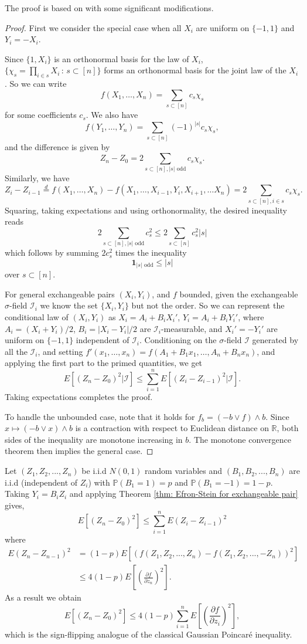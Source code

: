 \documentclass[letterpaper, 12pt]{article}
\theoremstyle{plain}
\theoremstyle{definition}
\theoremstyle{remark}
\begin{document}
The proof is based on \cite{steele1986efron} with some significant modifications.
\begin{proof}
First we consider the special case when all \(X_i\) are uniform on \(\{-1,1\}\) and \(Y_i=-X_i\).

Since \(\{1,X_i\}\) is an orthonormal basis for the law of \(X_i\), \(\{\chi_s=\prod_{i\in s}X_i\,:\,s\subset [n]\}\) forms an orthonormal basis for the joint law of the \(X_i\). So we can write
$$f(X_1,\ldots, X_n)=\sum_{s\subset [n]
}c_s\chi_s$$ for some coefficients \(c_s\). We also have
$$f(Y_1,\ldots, Y_n)=\sum_{s\subset[n]}(-1)^{|s|}c_s\chi_s,$$ and the difference is given by
$$
Z_n-Z_0=2\sum_{s\subset [n],|s| \text{ odd}} c_s\chi_s.
$$
Similarly, we have
$$
Z_{i}-Z_{i-1}\stackrel{d}{=}f(X_1,\ldots,X_n)-f(X_1,\ldots,X_{i-1}, Y_{i},X_{i+1},\ldots X_n)=2\sum_{s\subset [n],i\in s}c_s\chi_s.
$$
Squaring, taking expectations and using orthonormality, the desired inequality reads
$$
2\sum_{s\subset [n],|s| \text{ odd}} c_s^2\le 2\sum_{s\subset [n]}c_s^2|s|
$$
which follows by summing \(2c_s^2\) times the inequality
$$
\mathbf 1_{|s|\text{ odd}}\le |s|
$$
over \(s\subset[n]\).

For general exchangeable pairs \((X_i,Y_i)\), and \(f\) bounded, given the exchangeable \(\sigma\)-field \(\mathcal I_i\) we know the set \(\{X_i,Y_i\}\) but not the order. So we can represent the conditional law of \((X_i,Y_i)\) as \(X_i=A_i+B_iX_i'\), \(Y_i=A_i+B_iY_i'\), where \(A_i=(X_i+Y_i)/2\), \(B_i=|X_i-Y_i|/2\) are \(\mathcal I_i\)-measurable, and \(X_i'=-Y_i'\) are uniform on \(\{-1,1\}\) independent of \(\mathcal I_i\). Conditioning on the \(\sigma\)-field \(\mathcal I\) generated by all the \(\mathcal I_i\), and setting \(f'(x_1,\ldots,x_n)=f(A_1+B_1x_1,\ldots ,A_n+B_nx_n)\), and applying the first part to the primed quantities,
we get
$$
E[(Z_n-Z_0)^2|\mathcal I]\le \sum_{i=1}^n E[(Z_i-Z_{i-1})^2|\mathcal I].
$$
Taking expectations completes the proof.

To handle the unbounded case, note that it holds for \(f_b=(-b \vee f)\wedge b\). Since \(x\mapsto (-b \vee x)\wedge b\) is a contraction with respect to Euclidean distance on \(\mathbb R\), both sides of the inequality are monotone increasing in \(b\). The monotone convergence theorem then implies the general case.
\end{proof}

Let \((Z_1,Z_2,...,Z_n)\) be i.i.d \(N(0,1)\) random variables and \((B_1,B_2,...,B_n)\) are i.i.d (independent of \(Z_i\)) with \(\mathbb{P}(B_1=1)=p\) and \(\mathbb{P}(B_1=-1)=1-p\). Taking \(Y_i=B_iZ_i\) and applying Theorem \ref{thm: Efron-Stein for exchangeable pair} gives,
    \[
    E[(Z_n-Z_0)^2]\leq \sum_{i=1}^n E(Z_i-Z_{i-1})^2
    \]
where \begin{align*}
    E(Z_{n}-Z_{n-1})^2&=(1-p)E[(f(Z_1,Z_2,...,Z_n)-f(Z_1,Z_2,...,-Z_n))^2]\\
    &\leq 4(1-p)E\left[\left(\frac{\partial f}{\partial z_n}\right)^2\right].
\end{align*}
As a result we obtain
\[
E[(Z_n-Z_0)^2]\le 4(1-p)\sum_{i=1}^nE\left[\left(\frac{\partial f}{\partial z_i}\right)^2\right],
\]
which is the sign-flipping analogue of the classical Gaussian Poincaré inequality.
\end{document}
